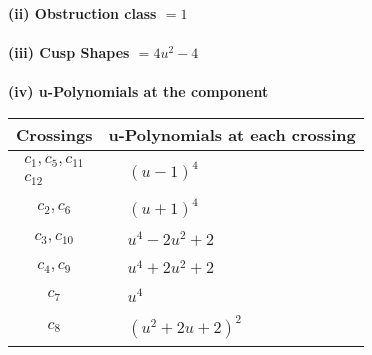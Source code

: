 \documentclass[1p]{elsarticle_modified}
\theoremstyle{definition}
\begin{document}
\flushleft \textbf{(ii) Obstruction class $= 1$}\\~\\
\flushleft \textbf{(iii) Cusp Shapes $= 4 u^2-4$}\\~\\
\newpage\renewcommand{\arraystretch}{1}
\flushleft \textbf{(iv) u-Polynomials at the component}\newline \\
\begin{tabular}{m{50pt}|m{274pt}}
Crossings & \hspace{64pt}u-Polynomials at each crossing \\
\hline $$\begin{aligned}c_{1},c_{5},c_{11}\\c_{12}\end{aligned}$$&$\begin{aligned}
&(u-1)^4
\end{aligned}$\\
\hline $$\begin{aligned}c_{2},c_{6}\end{aligned}$$&$\begin{aligned}
&(u+1)^4
\end{aligned}$\\
\hline $$\begin{aligned}c_{3},c_{10}\end{aligned}$$&$\begin{aligned}
&u^4-2 u^2+2
\end{aligned}$\\
\hline $$\begin{aligned}c_{4},c_{9}\end{aligned}$$&$\begin{aligned}
&u^4+2 u^2+2
\end{aligned}$\\
\hline $$\begin{aligned}c_{7}\end{aligned}$$&$\begin{aligned}
&u^4
\end{aligned}$\\
\hline $$\begin{aligned}c_{8}\end{aligned}$$&$\begin{aligned}
&(u^2+2 u+2)^2
\end{aligned}$\\
\hline
\end{tabular}\\~\\
\end{document}
